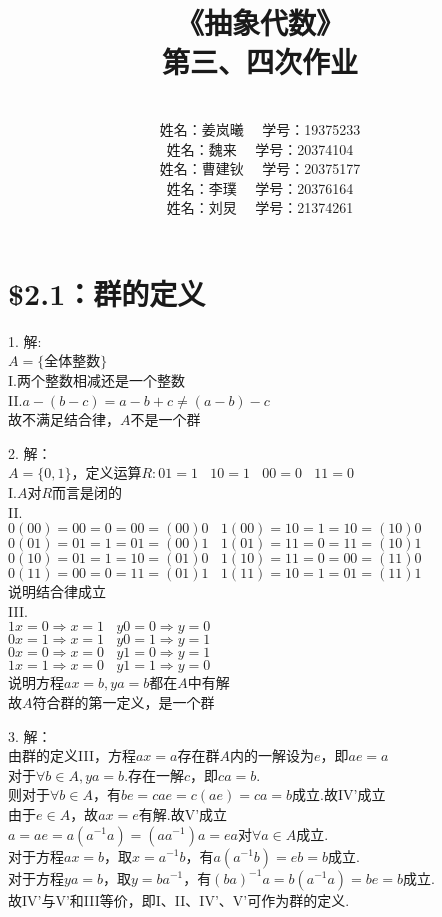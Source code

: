 \documentclass{ctexart}
\title{《抽象代数》\\ 第三、四次作业}
\author{\\姓名：姜岚曦 \ \ 学号：19375233
		\\姓名：魏来   \ \ 学号：20374104         
	    \\姓名：曹建钬 \ \ 学号：20375177
        \\姓名：李璞   \ \ 学号：20376164
        \\姓名：刘炅   \ \ 学号：21374261}
\date{}
\begin{document}
\pagestyle{empty}
\thispagestyle{empty}
\maketitle
\clearpage	
	
\section*{\$2.1：群的定义}
1. 
解: \\
$A = \{$全体整数$\}$\\
I.两个整数相减还是一个整数 \\
II.$a-(b-c)=a-b+c\neq (a-b)-c$\\
故不满足结合律，$A$不是一个群

2. 
解：\\
$A=\{0,1\}$，定义运算$R: 01=1\ \ \ \ 10=1 \ \ \ \ 00=0 \ \ \ \ 11=0$\\
I.$A$对$R$而言是闭的\\
II.\\ $0(00)=00=0=00=(00)0 \ \ \ \ 1(00)=10=1=10=(10)0$ \\
$0(01)=01=1=01=(00)1 \ \ \ \ 1(01)=11=0=11=(10)1$ \\
$0(10)=01=1=10=(01)0 \ \ \ \ 1(10)=11=0=00=(11)0$ \\
$0(11)=00=0=11=(01)1 \ \ \ \ 1(11)=10=1=01=(11)1$ \\
说明结合律成立\\
III.\\
$1x=0 \Rightarrow x=1 \ \ \ \ y0=0 \Rightarrow y=0$\\
$0x=1 \Rightarrow x=1 \ \ \ \ y0=1 \Rightarrow y=1$\\
$0x=0 \Rightarrow x=0 \ \ \ \ y1=0 \Rightarrow y=1$\\
$1x=1 \Rightarrow x=0 \ \ \ \ y1=1 \Rightarrow y=0$\\
说明方程$ax=b,ya=b$都在$A$中有解\\
故$A$符合群的第一定义，是一个群

3. 
解：\\
由群的定义III，方程$ax=a$存在群$A$内的一解设为$e$，即$ae=a$\\
对于$\forall b \in A,ya=b$.存在一解$c$，即$ca=b$.\\
则对于$\forall b \in A$，有$be=cae=c(ae)=ca=b$成立.故IV'成立\\
由于$e\in A$，故$ax=e$有解.故V'成立\\
$a=ae=a(a^{-1}a)=(aa^{-1})a=ea$对$\forall a\in A$成立. \\
对于方程$ax=b$，取$x=a^{-1}b$，有$a(a^{-1}b)=eb =b$成立.\\
对于方程$ya=b$，取$y=ba^{-1}$，有$(ba)^{-1}a=b(a^{-1}a)=be=b$成立.\\
故IV'与V'和III等价，即I、II、IV'、V'可作为群的定义.
\end{document}
